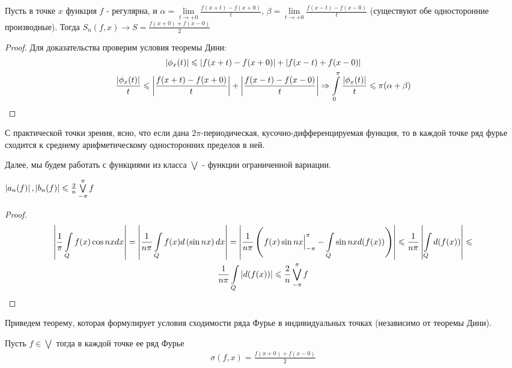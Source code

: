 \begin{corollary}
	Пусть в точке $x$ функция $f$ - регулярна, и 
	$\alpha = \lim\limits_{t\rightarrow +0}\frac{f(x + t) - f(x + 0)}{t}$,
	$\beta = \lim\limits_{t\rightarrow +0}\frac{f(x - t) - f(x - 0)}{t}$
	(существуют обе односторонние производные).
	Тогда $S_n(f, x) \rightarrow S = \frac{f(x + 0) + f(x - 0)}{2}$
\end{corollary}
	
\begin{proof}
	Для доказательства проверим условия теоремы Дини:
	\begin{gather*}
		\left|\phi_x(t)\right| \leqslant \left|f(x + t) - f(x + 0)\right| + \left|f(x - t) + f(x - 0)\right|\\
		\frac{\left|\phi_x(t)\right|}{t} \leqslant \left|\frac{f(x + t) - f(x + 0)}{t}\right| + 
		\left|\frac{f(x - t) - f(x - 0)}{t}\right|\Rightarrow
		\int\limits_{0}^{\pi} \frac{\left|\phi_x(t)\right|}{t} \leqslant \pi(\alpha + \beta)
	\end{gather*}
\end{proof}


С практической точки зрения, ясно, что если дана $2\pi$-периодическая, 
кусочно-дифференцируемая функция, то в каждой точке 
ряд фурье сходится к среднему арифметическому односторонних пределов в ней.

Далее, мы будем работать с функциями из класса $\bigvee$ - функции ограниченной вариации.
\begin{statement}
	$\left|a_n(f)\right|, \left|b_n(f)\right| \leqslant \frac{2}{n}\bigvee\limits_{-\pi}^{\pi} f$
\end{statement}

\begin{proof}
	\begin{gather*}
		\left|\frac{1}{\pi}\int\limits_{Q}f(x)\cos nx dx\right| = 
		\left|\frac{1}{n \pi}\int\limits_{Q} f(x) d\left(\sin nx \right)dx \right| =
		\left|\frac{1}{n \pi} \left( f(x) \sin nx \Big|_{-\pi}^{\pi} - 
		\int\limits_{Q} \sin nx d( f(x))\right)\right| \leqslant
		{\frac{1}{n \pi} \left|\int\limits_{Q} d (f(x))\right|} \leqslant \\
		{\frac{1}{n \pi} \int\limits_{Q} \left|d (f(x))\right|} \leqslant 
		\frac{2}{n}\bigvee\limits_{-\pi}^{\pi} f
	\end{gather*}
\end{proof}

Приведем теорему, которая формулирует условия сходимости ряда Фурье в индивидуальных точках 
(независимо от теоремы Дини).

\begin{theorem}
	Пусть $f \in \bigvee$ тогда в каждой точке ее ряд Фурье 
	\begin{gather*}
		\sigma(f,x) = \frac{f(x + 0) + f(x - 0)}{2}
	\end{gather*}
\end{theorem}

